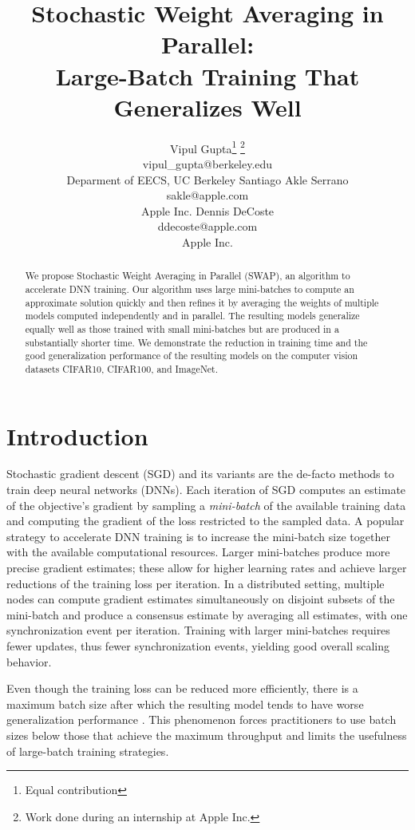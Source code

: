 \documentclass{article} %
\title{Stochastic Weight Averaging in Parallel: \\ Large-Batch Training That Generalizes Well}
\author{Vipul Gupta\thanks{Equal contribution} \thanks{Work done during an internship at Apple Inc.} \\
	vipul\_gupta@berkeley.edu \\
	Deparment of EECS, UC Berkeley 
	\And Santiago Akle Serrano \footnotemark[1] \\
	sakle@apple.com \\
	Apple Inc. 
	\And Dennis DeCoste \\
	ddecoste@apple.com \\
	Apple Inc.}
\begin{document}
\maketitle

\vspace{-0.2in}

\begin{abstract}
 We propose Stochastic Weight Averaging in Parallel (SWAP), an algorithm to
 accelerate DNN training. Our algorithm uses large mini-batches to compute an
 approximate solution quickly and then refines it by averaging the weights of
 multiple models computed independently and in parallel. The resulting models
 generalize equally well as those trained with small mini-batches but are
 produced in a substantially shorter time. We demonstrate the reduction in
 training time and the good generalization performance of the resulting models on
 the computer vision datasets CIFAR10, CIFAR100, and ImageNet.
\end{abstract}

\vspace{-0.2in}

\section{Introduction}
\vspace{-0.1cm}

Stochastic gradient descent (SGD) and its variants are the de-facto methods to
train deep neural networks (DNNs). Each iteration of SGD computes an estimate
of the objective's gradient by sampling a \emph{mini-batch} of the available
training data and computing the gradient of the loss restricted to the sampled
data. 
A popular strategy to accelerate DNN training is to increase the mini-batch
size together with the available computational resources. Larger
mini-batches produce more precise gradient estimates; these allow for higher
learning rates and achieve larger reductions of the training loss per
iteration. In a distributed setting, multiple nodes can compute gradient
estimates simultaneously on disjoint subsets of the mini-batch and produce a
consensus estimate by averaging all estimates, with one
synchronization event per iteration. Training with larger mini-batches
requires fewer updates, thus fewer synchronization events, yielding good overall
scaling behavior.

Even though the training loss can be reduced more efficiently, there
is a maximum batch size after which the resulting model tends to have
worse generalization performance 
\citep{openai,keskar,hoffer17,LBempGolmant:2018,LBnotEmp:2018shallue}. This
phenomenon forces practitioners to use batch sizes below those that achieve the 
maximum throughput and limits the usefulness of large-batch training strategies.
 
\end{document}
